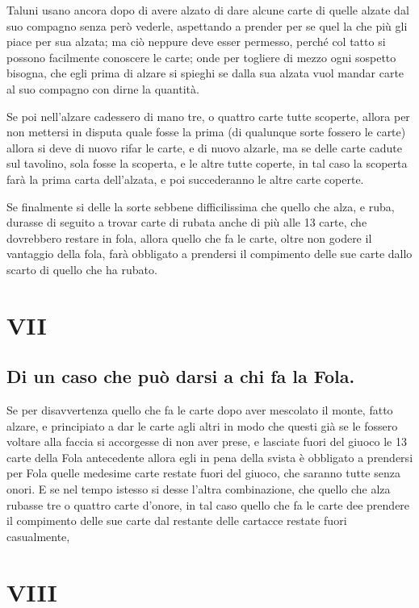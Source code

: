 \documentclass[11pt,a6paper]{article}
\begin{document}
Taluni usano ancora dopo di avere alzato di dare alcune carte di quelle alzate dal suo compagno senza però vederle, aspettando a prender per se quel la che più gli piace per sua alzata; ma
ciò neppure deve esser permesso, perché col tatto si possono facilmente conoscere le carte; onde per togliere di mezzo ogni sospetto bisogna, che egli prima di alzare si spieghi se dalla sua alzata vuol mandar carte al suo compagno con dirne la quantità.

Se poi nell'alzare cadessero di mano tre, o quattro carte tutte scoperte, allora per non mettersi in disputa quale fosse la prima (di qualunque sorte fossero le carte) allora si deve di nuovo rifar le carte, e di nuovo alzarle, ma se delle carte cadute sul tavolino, sola fosse la scoperta, e le altre tutte coperte, in tal caso la scoperta farà la prima carta dell'alzata, e poi succederanno le altre carte coperte.

Se finalmente si delle la sorte sebbene difficilissima che quello che alza, e ruba, durasse di seguito a trovar carte di rubata anche di più alle 13 carte, che dovrebbero restare in fola, allora quello che fa le carte, oltre non godere il vantaggio della fola, farà obbligato a
prendersi il compimento delle sue carte dallo scarto di quello che ha rubato.


\section{VII}
\subsection*{Di un caso che può darsi a chi fa la Fola.}

Se per disavvertenza quello che fa le
carte dopo aver mescolato il monte, fatto alzare, e principiato a dar le carte agli altri in modo che questi già se le fossero voltare alla faccia si accorgesse di non aver prese, e lasciate fuori del giuoco le 13 carte della Fola antecedente allora egli in pena della svista è obbligato a prendersi per Fola quelle medesime carte restate fuori del giuoco, che saranno tutte senza onori. E se nel tempo istesso si desse l'altra combinazione, che quello che alza rubasse tre o quattro carte d'onore, in tal caso quello che fa le carte dee prendere il compimento delle sue carte dal restante delle cartacce restate fuori casualmente,

\section{VIII}
\end{document}

